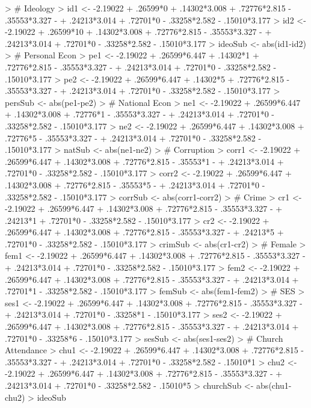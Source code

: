 \documentclass[12pt]{article}
\begin{document}
\begin{enumerate}
\begin{Schunk}
\begin{Sinput}
> # Ideology
> id1 <- -2.19022 + .26599*0 + .14302*3.008 + .72776*2.815 - .35553*3.327 -
+   .24213*3.014 + .72701*0 - .33258*2.582 - .15010*3.177
> id2 <- -2.19022 + .26599*10 + .14302*3.008 + .72776*2.815 - .35553*3.327 -
+   .24213*3.014 + .72701*0 - .33258*2.582 - .15010*3.177
> ideoSub <- abs(id1-id2)
> # Personal Econ
> pe1 <- -2.19022 + .26599*6.447 + .14302*1 + .72776*2.815 - .35553*3.327 -
+   .24213*3.014 + .72701*0 - .33258*2.582 - .15010*3.177
> pe2 <- -2.19022 + .26599*6.447 + .14302*5 + .72776*2.815 - .35553*3.327 -
+   .24213*3.014 + .72701*0 - .33258*2.582 - .15010*3.177
> persSub <- abs(pe1-pe2)
> # National Econ
> ne1 <- -2.19022 + .26599*6.447 + .14302*3.008 + .72776*1 - .35553*3.327 -
+   .24213*3.014 + .72701*0 - .33258*2.582 - .15010*3.177
> ne2 <- -2.19022 + .26599*6.447 + .14302*3.008 + .72776*5 - .35553*3.327 -
+   .24213*3.014 + .72701*0 - .33258*2.582 - .15010*3.177
> natSub <- abs(ne1-ne2)
> # Corruption
> corr1 <- -2.19022 + .26599*6.447 + .14302*3.008 + .72776*2.815 - .35553*1 -
+   .24213*3.014 + .72701*0 - .33258*2.582 - .15010*3.177
> corr2 <- -2.19022 + .26599*6.447 + .14302*3.008 + .72776*2.815 - .35553*5 -
+   .24213*3.014 + .72701*0 - .33258*2.582 - .15010*3.177
> corrSub <- abs(corr1-corr2)
> # Crime
> cr1 <- -2.19022 + .26599*6.447 + .14302*3.008 + .72776*2.815 - .35553*3.327 -
+   .24213*1 + .72701*0 - .33258*2.582 - .15010*3.177
> cr2 <- -2.19022 + .26599*6.447 + .14302*3.008 + .72776*2.815 - .35553*3.327 -
+   .24213*5 + .72701*0 - .33258*2.582 - .15010*3.177
> crimSub <- abs(cr1-cr2)
> # Female
> fem1 <- -2.19022 + .26599*6.447 + .14302*3.008 + .72776*2.815 - .35553*3.327 -
+   .24213*3.014 + .72701*0 - .33258*2.582 - .15010*3.177
> fem2 <- -2.19022 + .26599*6.447 + .14302*3.008 + .72776*2.815 - .35553*3.327 -
+   .24213*3.014 + .72701*1 - .33258*2.582 - .15010*3.177
> femSub <- abs(fem1-fem2)
> # SES
> ses1 <- -2.19022 + .26599*6.447 + .14302*3.008 + .72776*2.815 - .35553*3.327 -
+   .24213*3.014 + .72701*0 - .33258*1 - .15010*3.177
> ses2 <- -2.19022 + .26599*6.447 + .14302*3.008 + .72776*2.815 - .35553*3.327 -
+   .24213*3.014 + .72701*0 - .33258*6 - .15010*3.177
> sesSub <- abs(ses1-ses2)
> # Church Attendance
> chu1 <- -2.19022 + .26599*6.447 + .14302*3.008 + .72776*2.815 - .35553*3.327 -
+   .24213*3.014 + .72701*0 - .33258*2.582 - .15010*1
> chu2 <- -2.19022 + .26599*6.447 + .14302*3.008 + .72776*2.815 - .35553*3.327 -
+   .24213*3.014 + .72701*0 - .33258*2.582 - .15010*5
> churchSub <- abs(chu1-chu2)
> ideoSub
\end{Sinput}

\end{Schunk}
\end{enumerate}
\end{document}
